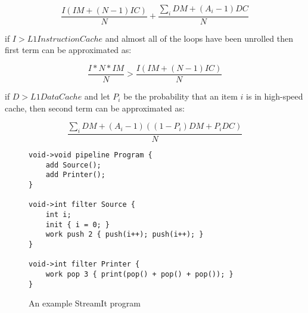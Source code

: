 \documentclass{sig-alternate}
\begin{document}
\begin{equation}
\frac{I (IM + (N-1) IC)}{N} + \frac{\sum_i{DM + (A_i-1) DC}}{N}
\end{equation}

if $I > L1InstructionCache$ and almost all of the loops have
been unrolled then first term can be approximated as:

\begin{equation}
\frac{I * N * IM}{N} > \frac{I (IM + (N-1) IC)}{N}
\end{equation}

if $D > L1DataCache$ and let $P_i$ be the probability that 
an item $i$ is in high-speed cache, then second term
can be approximated as: 

\begin{equation}
\frac{\sum_i{DM + (A_i-1)((1-P_i) DM + P_i DC)}}{N}
\end{equation}











\begin{figure}
\begin{verbatim}
void->void pipeline Program {
    add Source();
    add Printer();
}

void->int filter Source {
    int i;
    init { i = 0; }
    work push 2 { push(i++); push(i++); } 
}

void->int filter Printer {
    work pop 3 { print(pop() + pop() + pop()); } 
}
\end{verbatim}
\caption{An example StreamIt program}
\end{figure}
\end{document}

